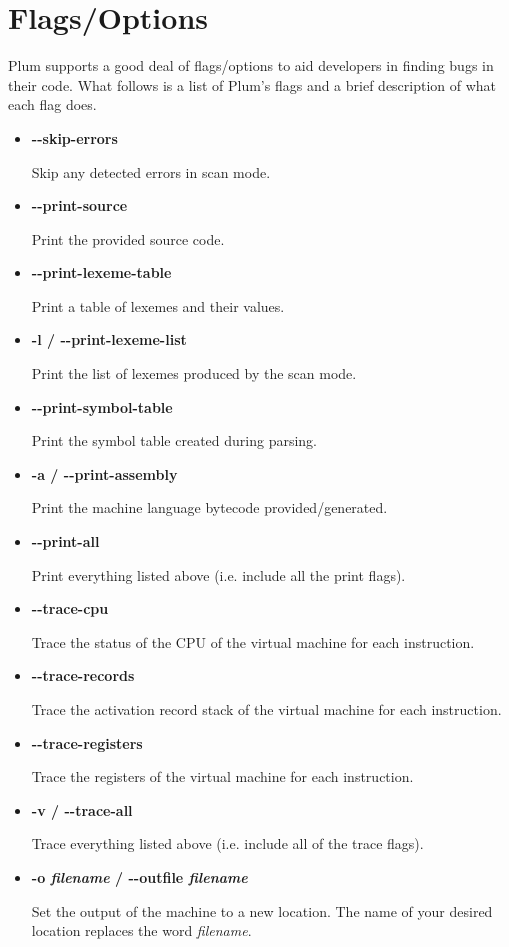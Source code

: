 \documentclass[12pt]{memoir}
\begin{document}
\section*{Flags/Options}
Plum supports a good deal of flags/options to aid developers in finding bugs in their code.
What follows is a list of Plum's flags and a brief description of what each flag does.
\begin{itemize}
    \item \textbf{{-}{-}skip-errors}

        Skip any detected errors in scan mode.

    \item \textbf{{-}{-}print-source}

        Print the provided source code.

    \item \textbf{{-}{-}print-lexeme-table}
        
        Print a table of lexemes and their values.

    \item \textbf{-l / {-}{-}print-lexeme-list}

        Print the list of lexemes produced by the scan mode.

    \item \textbf{{-}{-}print-symbol-table}

        Print the symbol table created during parsing.

    \item \textbf{-a / {-}{-}print-assembly}
    
        Print the machine language bytecode provided/generated.

    \item \textbf{{-}{-}print-all}
        
        Print everything listed above (i.e. include all the print flags).

    \item \textbf{{-}{-}trace-cpu}
    
        Trace the status of the CPU of the virtual machine for each instruction.

    \item \textbf{{-}{-}trace-records}

        Trace the activation record stack of the virtual machine for each instruction.

    \item \textbf{{-}{-}trace-registers}

        Trace the registers of the virtual machine for each instruction.

    \item \textbf{-v / {-}{-}trace-all}

        Trace everything listed above (i.e. include all of the trace flags).

    \item \textbf{-o \emph{filename} / {-}{-}outfile \emph{filename}}

        Set the output of the machine to a new location. The name of your desired
        location replaces the word \emph{filename}.

\end{itemize}
\end{document}
